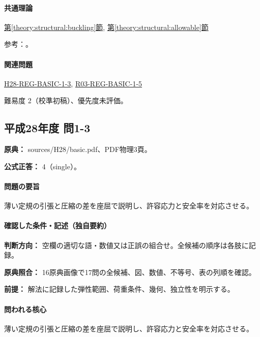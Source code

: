 \paragraph{共通理論} \hyperref[theory:structural:buckling]{第\ref*{theory:structural:buckling}節}, \hyperref[theory:structural:allowable]{第\ref*{theory:structural:allowable}節}

\par 参考：\cite{struct_mit_beam,struct_mit_buckling,struct_mlit_limit}。

\paragraph{関連問題} \hyperref[q:h28-reg-basic-1-3]{H28-REG-BASIC-1-3}, \hyperref[q:r03-reg-basic-1-5]{R03-REG-BASIC-1-5}

\par 難易度 2（校準初稿）、優先度未評価。

\subsection{平成28年度 問1-3}
\label{q:h28-reg-basic-1-3}

\noindent\textbf{原典：} sources/H28/basic.pdf、PDF物理3頁。

\textbf{公式正答：} 4（single）。

\paragraph{問題の要旨} 薄い定規の引張と圧縮の差を座屈で説明し、許容応力と安全率を対応させる。

\paragraph{確認した条件・記述（独自要約）}\mbox{}\par

\noindent\textbf{判断方向：} 空欄の適切な語・数値又は正誤の組合せ。全候補の順序は各肢に記録。\par

\noindent\textbf{原典照合：} 16原典画像で17問の全候補、図、数値、不等号、表の列順を確認。\par

\noindent\textbf{前提：} 解法に記録した弾性範囲、荷重条件、幾何、独立性を明示する。\par

\paragraph{問われる核心} 薄い定規の引張と圧縮の差を座屈で説明し、許容応力と安全率を対応させる。

